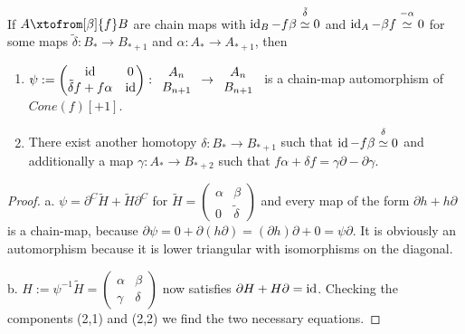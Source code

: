 \documentclass[fontsize=11pt,fleqn,a4paper]{scrartcl}
\begin{document}
\begin{lemma}\label{homalg:modifying_homotopy_equivalence}
If $A \xtofrom[\beta]{f} B$ are chain maps with $\operatorname{id}_B-f\beta \overset{ \tilde{\delta}}{\overset{}{\simeq}} 0$ and $\operatorname{id}_A-\beta f \overset{-\alpha}{\overset{}{\simeq}} 0$ for some maps $\tilde{\delta}: B_\ast\to B_{\ast+1}$ and $\alpha: A_\ast \to A_{\ast+1}$, then
\begin{enumerate}
\item $\psi:=\begin{pmatrix}\operatorname{id}&0\\\tilde{\delta}f+f\alpha&\operatorname{id}\end{pmatrix}: \begin{array}{c}A_n\\B_{n+1}\end{array} \to \begin{array}{c}A_n\\B_{n+1}\end{array}$ is a chain-map automorphism of $Cone(f)[+1]$.
\item There exist another homotopy $\delta: B_\ast\to B_{\ast+1}$ such that $\operatorname{id}-f\beta \overset{\delta}{\overset{}{\simeq}} 0$ and additionally a map $\gamma: A_\ast \to B_{\ast+2}$ such that $f\alpha + \delta f = \gamma\partial - \partial\gamma$.
\end{enumerate}
\end{lemma}
\begin{proof}
a. $\psi=\partial^C \tilde{H} + \tilde{H}\partial^C$ for $\tilde{H}=\begin{pmatrix}\alpha&\beta\\0&\tilde{\delta}\end{pmatrix}$ and every map of the form $\partial h + h\partial$ is a chain-map, because $\partial\psi = 0+\partial(h \partial) = (\partial h)\partial + 0 = \psi \partial$. It is obviously an automorphism because it is lower triangular with isomorphisms on the diagonal.

b. $H:=\psi^{-1} \tilde{H} = \begin{pmatrix}\alpha&\beta\\\gamma&\delta\end{pmatrix}$ now satisfies $\partial H+H\partial = \operatorname{id}$. Checking the components (2,1) and (2,2) we find the two necessary equations.
\end{proof}
\end{document}
